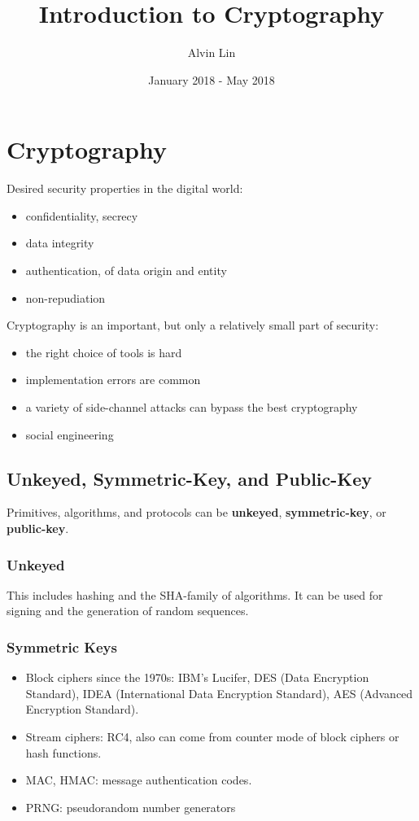 \documentclass{math}
\title{Introduction to Cryptography}
\author{Alvin Lin}
\date{January 2018 - May 2018}
\begin{document}
\maketitle

\section*{Cryptography}
Desired security properties in the digital world:
\begin{itemize}
  \item confidentiality, secrecy
  \item data integrity
  \item authentication, of data origin and entity
  \item non-repudiation
\end{itemize}
Cryptography is an important, but only a relatively small part of security:
\begin{itemize}
  \item the right choice of tools is hard
  \item implementation errors are common
  \item a variety of side-channel attacks can bypass the best cryptography
  \item social engineering
\end{itemize}

\subsection*{Unkeyed, Symmetric-Key, and Public-Key}
Primitives, algorithms, and protocols can be \textbf{unkeyed},
\textbf{symmetric-key}, or \textbf{public-key}.

\subsubsection*{Unkeyed}
This includes hashing and the SHA-family of algorithms. It can be used for
signing and the generation of random sequences.

\subsubsection*{Symmetric Keys}
\begin{itemize}
  \item Block ciphers since the 1970s: IBM's Lucifer, DES (Data Encryption
  Standard), IDEA (International Data Encryption Standard), AES (Advanced
  Encryption Standard).
  \item Stream ciphers: RC4, also can come from counter mode of block ciphers
  or hash functions.
  \item MAC, HMAC: message authentication codes.
  \item PRNG: pseudorandom number generators
\end{itemize}
\end{document}
